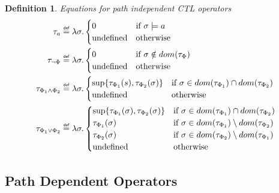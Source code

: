 \documentclass[11pt,a4paper,titlepage]{article}
\newtheorem{definition}{Definition}[section]
\newcommand\eqdef{\mathrel{\overset{\makebox[0pt]{\mbox{\normalfont\tiny\sffamily def}}}{=}}}
\begin{document}
\begin{definition}\label{def:ctl_semantics_basic}
    Equations for path independent CTL operators
    \setlength{\jot}{15pt}
    \begin{align}
        \tau_a &\eqdef \lambda \sigma.
        \begin{cases}
            0                   & \text{if} \ \sigma \models a \\
            \text{undefined}    & \text{otherwise}
        \end{cases}\\
        \tau_{\neg \Phi} &\eqdef \lambda \sigma.
        \begin{cases}
            0                   & \text{if} \ \sigma \notin dom(\tau_{\Phi}) \\
            \text{undefined}    & \text{otherwise}
        \end{cases}\label{eq:ctl_not}
        \\
        \tau_{\Phi_1 \land \Phi_2} &\eqdef \lambda \sigma.
        \begin{cases}
            \sup\{\tau_{\Phi_1}(s), \tau_{\Phi_2}(\sigma)\} 
                                &\text{if } \sigma \in dom(\tau_{\Phi_1}) \cap dom(\tau_{\Phi_2}) \\
            \text{undefined}    & \text{otherwise}
        \end{cases}\\
        \tau_{\Phi_1 \lor \Phi_2} &\eqdef \lambda \sigma.
        \begin{cases}
            \sup\{\tau_{\Phi_1}(\sigma), \tau_{\Phi_2}(\sigma)\}         & \text{if} \ \sigma \in dom(\tau_{\Phi_1}) \cap dom(\tau_{\Phi_2}) \\
            \tau_{\Phi_1}(\sigma)                                        & \text{if} \ \sigma \in dom(\tau_{\Phi_1}) \setminus dom(\tau_{\Phi_2}) \\
            \tau_{\Phi_2}(\sigma)                                        & \text{if} \ \sigma \in dom(\tau_{\Phi_2}) \setminus dom(\tau_{\Phi_1}) \\
            \text{undefined}    & \text{otherwise}
        \end{cases}
    \end{align}
\end{definition}

\subsection{Path Dependent Operators}
\end{document}
